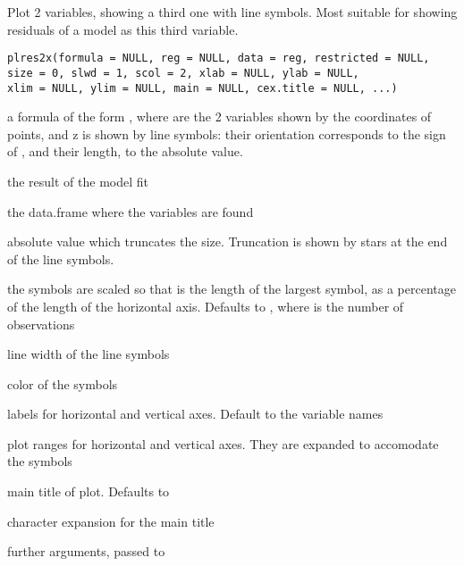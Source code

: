 \documentclass{article}
\begin{document}
\begin{Description}\relax
Plot 2 variables, showing a third one with line symbols. Most suitable
for showing residuals of a model as this third variable.
\end{Description}
\begin{Usage}
\begin{verbatim}
plres2x(formula = NULL, reg = NULL, data = reg, restricted = NULL,
size = 0, slwd = 1, scol = 2, xlab = NULL, ylab = NULL,
xlim = NULL, ylim = NULL, main = NULL, cex.title = NULL, ...)
\end{verbatim}
\end{Usage}
\begin{Arguments}
\begin{ldescription}
\item[\code{formula}] a formula of the form , where
 are the 2 variables shown by the coordinates of points,
and z is shown by line symbols: their orientation corresponds
to the sign of , and their length, to the absolute value.

\item[\code{reg}] the result of the model fit
\item[\code{data}] the data.frame where the variables are found
\item[\code{restricted}] absolute value which truncates the size. Truncation
is shown by stars at the end of the line symbols.

\item[\code{size}] the symbols are scaled so that  is the length of
the largest symbol, as a percentage of the length
of the horizontal axis. Defaults to , where
 is the number of observations
\item[\code{slwd}] line width of the line symbols
\item[\code{scol}] color of the symbols
\item[\code{xlab, ylab}] labels for horizontal and vertical axes.
Default to the variable names
\item[\code{xlim, ylim}] plot ranges for horizontal and vertical axes.
They are expanded to accomodate the symbols
\item[\code{main}] main title of plot.
Defaults to 
\item[\code{cex.title}] character expansion for the main title
\item[\code{...}] further arguments, passed to 
\end{ldescription}
\end{Arguments}
\end{document}
